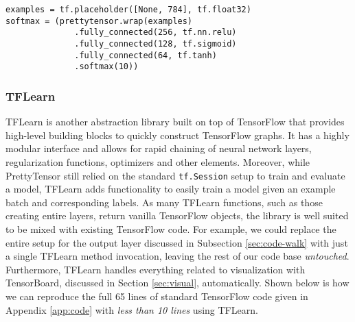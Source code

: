 \begin{lstlisting}
examples = tf.placeholder([None, 784], tf.float32)
softmax = (prettytensor.wrap(examples)
              .fully_connected(256, tf.nn.relu)
              .fully_connected(128, tf.sigmoid)
              .fully_connected(64, tf.tanh)
              .softmax(10))
\end{lstlisting}

\subsubsection{TFLearn}\label{sec:code-abstract-prettytensor}

TFLearn is another abstraction library built on top of TensorFlow that provides
high-level building blocks to quickly construct TensorFlow graphs. It has a
highly modular interface and allows for rapid chaining of neural network layers,
regularization functions, optimizers and other elements. Moreover, while
PrettyTensor still relied on the standard \texttt{tf.Session} setup to train and
evaluate a model, TFLearn adds functionality to easily train a model given an
example batch and corresponding labels. As many TFLearn functions, such as those
creating entire layers, return vanilla TensorFlow objects, the library is well
suited to be mixed with existing TensorFlow code. For example, we could replace
the entire setup for the output layer discussed in Subsection
\ref{sec:code-walk} with just a single TFLearn method invocation, leaving the
rest of our code base \emph{untouched}. Furthermore, TFLearn handles everything
related to visualization with TensorBoard, discussed in Section
\ref{sec:visual}, automatically. Shown below is how we can reproduce the full 65
lines of standard TensorFlow code given in Appendix \ref{app:code} with
\emph{less than 10 lines} using TFLearn.



